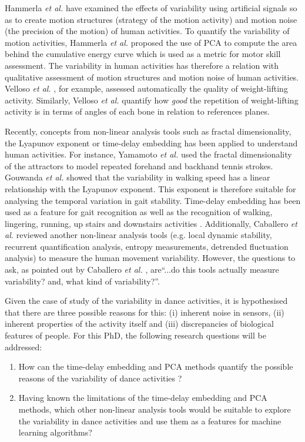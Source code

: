 \documentclass[10pt,journal,compsoc]{IEEEtran}
\begin{document}
Hammerla \emph{et al.} \cite{hammerla2011} have examined the effects of
variability using artificial signals so as to create motion structures (strategy of 
the motion activity) and motion noise (the precision of the motion) of human activities. 
To quantify the variability of motion activities, Hammerla \emph{et al.} 
\cite{hammerla2011} proposed the use of PCA to compute the area behind 
the cumulative energy curve which is used as a metric for motor skill assessment.
The variability in human activities has therefore a relation with qualitative assessment
of motion structures and motion noise of human activities.
Velloso \emph{et al.} \cite{Velloso2013a}, for example, assessed automatically the quality 
of weight-lifting activity.
Similarly, Velloso \emph{et al.} \cite{Velloso2013b} quantify how \textit{good} the repetition of 
weight-lifting activity is in terms of angles of each bone in relation to references planes. 




Recently, concepts from non-linear analysis tools such as fractal dimensionality, 
the Lyapunov exponent or time-delay embedding has been applied to understand human activities.
For instance, Yamamoto \emph{et al.} \cite{Suzuki2013, Yamamoto2000} used the fractal dimensionality 
of the attractors to model repeated forehand and backhand tennis strokes.
Gouwanda \emph{et al.} \cite{Gouwanda2012} showed that the variability in walking speed 
has a linear relationship with the Lyapunov exponent. This exponent is therefore suitable 
for analysing the temporal variation in gait stability.
Time-delay embedding has been used as a feature 
for gait recognition \cite{Sama2013} as well as the recognition of walking, lingering, 
running, up stairs and downstairs activities \cite{Frank2010}.
Additionally,  Caballero \emph{et al.} \cite{Caballero2014} reviewed 
another non-linear analysis tools
(e.g. local dynamic stability, recurrent quantification analysis, entropy measurements,
detrended fluctuation analysis) to measure the human movement variability. 
However, the questions to ask, as pointed out by Caballero \emph{et al.} \cite{Caballero2014}, 
are``...do this tools actually measure variability? and, what kind of variability?''.

Given the case of study of the variability in dance activities, it is hypothesised that 
there are three possible reasons for this:
(i) inherent noise in sensors, 
(ii) inherent properties of the activity itself and
(iii) discrepancies of biological features of people.
For this PhD, the following research questions will be addressed:
\begin{enumerate}
 \item How can the time-delay embedding and PCA methods quantify the possible reasons of 
 the variability of dance activities ?
 \item Having known the limitations of the time-delay embedding and PCA methods,
 which other non-linear analysis tools would be suitable to explore the variability in dance
	activities and use them as a features for machine learning algorithms?
\end{enumerate}
\end{document}
